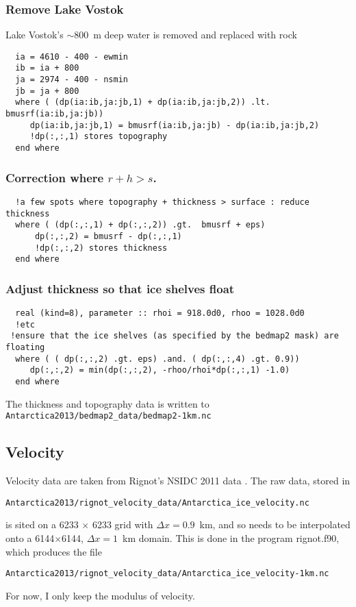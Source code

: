 \documentclass{article}
\newcommand{\usrf}{s}
\newcommand{\topg}{r}
\newcommand{\thk}{h}
\begin{document}
\subsubsection{Remove Lake Vostok}
Lake Vostok's $\sim 800$~m deep water is removed and replaced with rock
\begin{lstlisting}
  ia = 4610 - 400 - ewmin
  ib = ia + 800
  ja = 2974 - 400 - nsmin
  jb = ja + 800
  where ( (dp(ia:ib,ja:jb,1) + dp(ia:ib,ja:jb,2)) .lt.  bmusrf(ia:ib,ja:jb))
     dp(ia:ib,ja:jb,1) = bmusrf(ia:ib,ja:jb) - dp(ia:ib,ja:jb,2) 
     !dp(:,:,1) stores topography
  end where
\end{lstlisting}

\subsubsection{Correction where $\topg + \thk > \usrf$.} 
\begin{lstlisting}
  !a few spots where topography + thickness > surface : reduce thickness
  where ( (dp(:,:,1) + dp(:,:,2)) .gt.  bmusrf + eps)
      dp(:,:,2) = bmusrf - dp(:,:,1)
      !dp(:,:,2) stores thickness
  end where
\end{lstlisting}

\subsubsection{Adjust thickness so that ice shelves float}
\begin{lstlisting}
  real (kind=8), parameter :: rhoi = 918.0d0, rhoo = 1028.0d0
  !etc
 !ensure that the ice shelves (as specified by the bedmap2 mask) are floating
  where ( ( dp(:,:,2) .gt. eps) .and. ( dp(:,:,4) .gt. 0.9))
     dp(:,:,2) = min(dp(:,:,2), -rhoo/rhoi*dp(:,:,1) -1.0)
  end where
\end{lstlisting}

The thickness and topography data is written to {\tt Antarctica2013/bedmap2\_data/bedmap2-1km.nc}



\subsection{Velocity}

Velocity data are taken from Rignot's NSIDC 2011 data \cite{RiMS11:doi:10.1126/science.1208336}.
The raw data, stored in
\begin{verbatim}
Antarctica2013/rignot_velocity_data/Antarctica_ice_velocity.nc
\end{verbatim}
is sited on a 6233 $\times$ 6233 grid with  $\Delta x = 0.9$~km, and so needs to be interpolated
onto a 6144$\times$6144, $\Delta x = 1$~km domain. This is done in the program  rignot.f90, which
produces the file
\begin{verbatim}
Antarctica2013/rignot_velocity_data/Antarctica_ice_velocity-1km.nc
\end{verbatim}
For now, I only keep the modulus of velocity.
\end{document}
